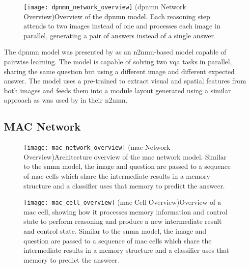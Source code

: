 \begin{figure}[htbp]
    \centering
    \texttt{[image: dpnmn\_network\_overview]}
    \captionsource(\acrshort{dpnmn} Network Overview){Overview of the \acrshort{dpnmn} model. Each reasoning step attends to two images instead of one and processes each image in parallel, generating a pair of answers instead of a single answer. \label{fig:dpnmn_network_overview}}{\citeauthor{su_toward_2020}\cite{su_toward_2020}}
\end{figure}

The \gls{dpnmn} model was presented by \citeauthor{su_toward_2020} \cite{su_toward_2020} as an \gls{n2nmn}-based model capable of pairwise learning.
The model is capable of solving two \gls{vqa} tasks in parallel, sharing the same question but using a different image and different expected answer.
The model uses a pre-trained  to extract visual and spatial features from both images and feeds them into a module layout generated using a similar approach as was used by \citeauthor{hu_learning_2017} in their \gls{n2nmn}.

\subsection{MAC Network}
\label{subsec:mac_network}

\begin{figure}[htbp]
    \centering
    \texttt{[image: mac\_network\_overview]}
    \captionsource(\acrshort{mac} Network Overview){Architecture overview of the \acrshort{mac} network model. Similar to the \gls{snmn} model, the image and question are passed to a sequence of \acrshort{mac} cells which share the intermediate results in a memory structure and a classifier uses that memory to predict the answeer. \label{fig:mac_network_overview}}{\citeauthor{hudson_compositional_2018}\cite{hudson_compositional_2018}}
\end{figure}
\begin{figure}[htbp]
    \centering
    \texttt{[image: mac\_cell\_overview]}
    \captionsource(\acrshort{mac} Cell Overview){Overview of a \acrshort{mac} cell, showing how it processes memory information and control state to perform reasoning and produce a new intermediate result and control state. Similar to the \gls{snmn} model, the image and question are passed to a sequence of \acrshort{mac} cells which share the intermediate results in a memory structure and a classifier uses that memory to predict the answeer. \label{fig:mac_cell_overview}}{\citeauthor{hudson_compositional_2018}\cite{hudson_compositional_2018}}
\end{figure}

